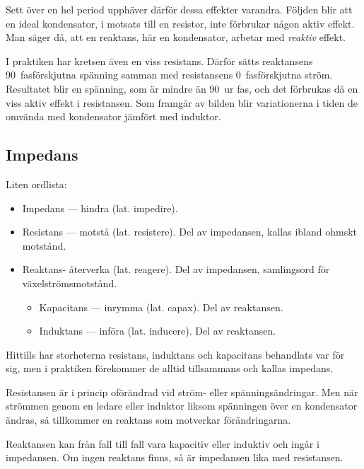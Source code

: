 Sett över en hel period upphäver därför dessa effekter varandra.
Följden blir att en ideal kondensator, i motsats till en resistor, inte
förbrukar någon aktiv effekt.
Man säger då, att en reaktans, här en kondensator, arbetar med \emph{reaktiv}
effekt.

I praktiken har kretsen även en viss resistans.
Därför sätts reaktansens 90\degree~fasförskjutna spänning samman med
resistansens 0\degree~fasförskjutna ström.
Resultatet blir en spänning, som är mindre än 90\degree~ur fas, och det
förbrukas då en viss aktiv effekt i resistansen.
Som framgår av bilden blir variationerna i tiden de omvända med kondensator
jämfört med induktor.

\subsection{Impedans}

Liten ordlista:
\begin{itemize}
\item Impedans --- hindra (lat. impedire).
\item Resistans --- motstå (lat. resistere).
  Del av impedansen, kallas ibland ohmskt motstånd.
\item Reaktans- återverka (lat. reagere).
  Del av impedansen, samlingsord för växelströmsmotstånd.
  \begin{itemize}
  \item Kapacitans --- inrymma (lat. capax). Del av reaktansen.
  \item Induktans --- införa (lat. inducere). Del av reaktansen.
  \end{itemize}
\end{itemize}

Hittills har storheterna resistans, induktans och kapacitans behandlats var för
sig, men i praktiken förekommer de alltid tillsammans och kallas impedans.

Resistansen är i princip oförändrad vid ström- eller spänningsändringar.
Men när strömmen genom en ledare eller induktor liksom spänningen över en
kondensator ändras, så tillkommer en reaktans som motverkar förändringarna.

Reaktansen kan från fall till fall vara kapacitiv eller induktiv och ingår i
impedansen.
Om ingen reaktans finns, så är impedansen lika med resistansen.

